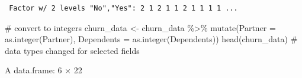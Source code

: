\documentclass[
  letterpaper,
  DIV=11,
  numbers=noendperiod]{scrreprt}
\newenvironment{Shaded}{\begin{snugshade}}{\end{snugshade}}
\newcommand{\AttributeTok}[1]{\textcolor[rgb]{0.40,0.45,0.13}{#1}}
\newcommand{\CommentTok}[1]{\textcolor[rgb]{0.37,0.37,0.37}{#1}}
\newcommand{\FunctionTok}[1]{\textcolor[rgb]{0.28,0.35,0.67}{#1}}
\newcommand{\NormalTok}[1]{\textcolor[rgb]{0.00,0.23,0.31}{#1}}
\newcommand{\OtherTok}[1]{\textcolor[rgb]{0.00,0.23,0.31}{#1}}
\newcommand{\SpecialCharTok}[1]{\textcolor[rgb]{0.37,0.37,0.37}{#1}}
\begin{document}
\begin{Shaded}
\end{Shaded}

\begin{verbatim}
 Factor w/ 2 levels "No","Yes": 2 1 2 1 1 2 1 1 1 1 ...
\end{verbatim}

\begin{Shaded}
\begin{Highlighting}[]
\CommentTok{\# convert to integers}
\NormalTok{churn\_data }\OtherTok{\textless{}{-}}\NormalTok{ churn\_data }\SpecialCharTok{\%\textgreater{}\%} \FunctionTok{mutate}\NormalTok{(}\AttributeTok{Partner =} \FunctionTok{as.integer}\NormalTok{(Partner),}
                                   \AttributeTok{Dependents =} \FunctionTok{as.integer}\NormalTok{(Dependents))}
\FunctionTok{head}\NormalTok{(churn\_data) }\CommentTok{\# data types changed for selected fields}
\end{Highlighting}
\end{Shaded}

A data.frame: 6 × 22
\end{document}
